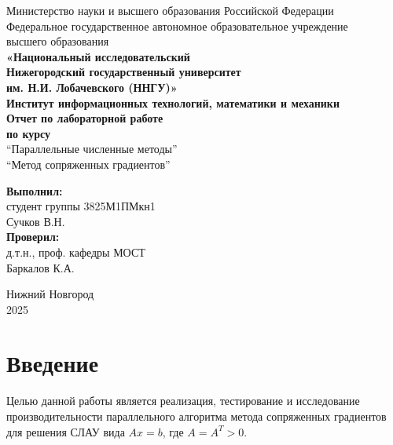 \documentclass[12pt, a4paper]{article}
\begin{document}
\begin{titlepage}

\begin{center}
Министерство науки и высшего образования Российской Федерации \\
Федеральное государственное автономное образовательное учреждение \\
высшего образования\\ 
\textbf{«Национальный исследовательский \\ Нижегородский государственный университет \\
им. Н.И. Лобачевского (ННГУ)»}\\[1.5cm]
\textbf{Институт информационных технологий, математики и механики }\\[5.5cm]

\textbf{Отчет по лабораторной работе} \\
\textbf{по курсу}  \\
``Параллельные численные методы'' \\
``Метод сопряженных градиентов'' \\ [5cm]


\begin{flushright}
\begin{minipage}{0.52\textwidth}
\begin{flushleft}
\textbf{Выполнил:} \\
студент группы 3825М1ПМкн1 \\
Сучков В.Н.\\[0.3cm]
\textbf{Проверил:}\\
д.т.н., проф. кафедры МОСТ\\  Баркалов К.А.\\[0.3cm]
\end{flushleft}
\end{minipage}
\end{flushright}

\vfill

Нижний Новгород \\
2025

\thispagestyle{empty}
\end{center}

\newpage
\end{titlepage}

\newpage
\tableofcontents
\newpage    

\section{Введение}
Целью данной работы является реализация, тестирование и исследование производительности 
параллельного алгоритма метода сопряженных градиентов для решения 
СЛАУ вида $Ax = b$, где $A = A^T > 0$.
\end{document}
